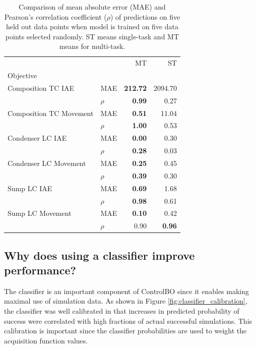 \begin{table}[]
    \centering
    \caption{Comparison of mean absolute error (MAE) and Pearson's correlation coefficient ($\rho$) of predictions on five held out data points when model is trained on five data points selected randomly. ST means single-task and MT means for multi-task.}
    \begin{tabular}{llrr}
    
    \toprule
                     &  &      MT &       ST \\
    Objective & {} &         &          \\
    \midrule
    Composition TC IAE & MAE&  \textbf{212.72} &  2094.70 \\
                     & $\rho$&    \textbf{0.99 }&     0.27 \\
    Composition TC Movement & MAE&    \textbf{0.51} &    11.04 \\
                     & $\rho$&    \textbf{1.00} &     0.53 \\
    Condenser LC IAE & MAE&    \textbf{0.00} &     0.30 \\
                     & $\rho$&    \textbf{0.28} &     0.03 \\
    Condenser LC Movement & MAE&    \textbf{0.25} &     0.45 \\
                     & $\rho$&    \textbf{0.39} &     0.30 \\
    Sump LC IAE & MAE&    \textbf{0.69} &     1.68 \\
                     & $\rho$&    \textbf{0.98} &     0.61 \\
    Sump LC Movement & MAE&    \textbf{0.10} &     0.42 \\
                     & $\rho$&    0.90 &    \textbf{ 0.96} \\
    \bottomrule
    \end{tabular}
    \label{tab:mt_vs_st_controlbo}
\end{table}


\subsection{Why does using a classifier improve performance?}

The classifier is an important component of ControlBO since it enables making maximal use of simulation data. As shown in Figure \ref{fig:classifier_calibration}, the classifier was well calibrated in that increases in predicted probability of success were correlated with high fractions of actual successful simulations. This calibration is important since the classifier probabilities are used to weight the acquisition function values.

